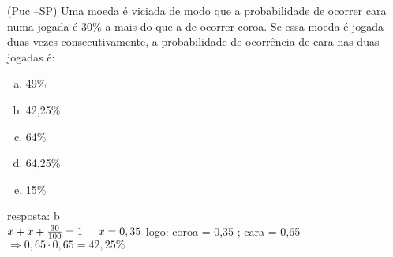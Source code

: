 \begin{ex}
(Puc –SP) Uma moeda é viciada de modo que a probabilidade de ocorrer cara numa jogada é 30\% a mais do que a de ocorrer coroa. Se essa moeda é jogada duas vezes consecutivamente, a probabilidade de ocorrência de cara nas duas jogadas é:
   \begin{enumerate}[(a)]
   \item 49\%
   \item 42,25\%
   \item 64\%
   \item 64,25\%
   \item 15\%
   \end{enumerate}
    \begin{sol}
     resposta: b \\
     $x+x+\frac{30}{100}=1\hspace{0,5cm} x = 0,35$\hspace{0,5cm} logo:  coroa = 0,35 ; cara = 0,65 \\
      $\Longrightarrow 0,65\cdot0,65= 42,25\%$
    \end{sol}
\end{ex}